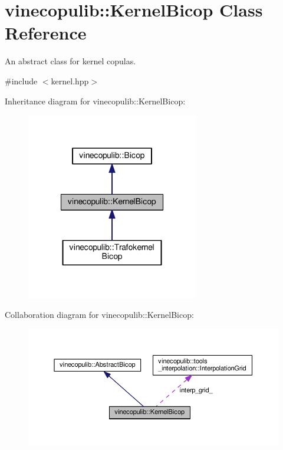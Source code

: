 \hypertarget{classvinecopulib_1_1_kernel_bicop}{}\section{vinecopulib\+:\+:Kernel\+Bicop Class Reference}
\label{classvinecopulib_1_1_kernel_bicop}


An abstract class for kernel copulas.  




{\ttfamily \#include $<$kernel.\+hpp$>$}



Inheritance diagram for vinecopulib\+:\+:Kernel\+Bicop\+:\nopagebreak
\begin{figure}[H]
\begin{center}
\leavevmode
\includegraphics[width=213pt]{classvinecopulib_1_1_kernel_bicop__inherit__graph}
\end{center}
\end{figure}


Collaboration diagram for vinecopulib\+:\+:Kernel\+Bicop\+:\nopagebreak
\begin{figure}[H]
\begin{center}
\leavevmode
\includegraphics[width=350pt]{classvinecopulib_1_1_kernel_bicop__coll__graph}
\end{center}
\end{figure}
